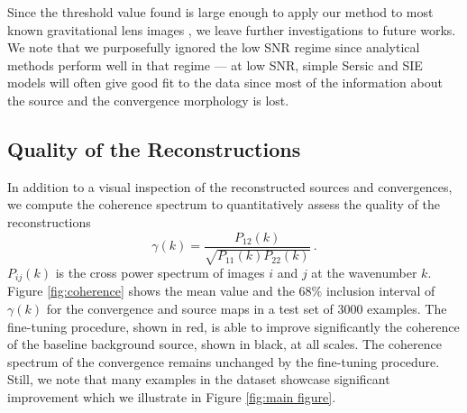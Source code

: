 Since the threshold value found is large enough to apply our method to most known 
gravitational lens images \citep{Bolton2008,Shu2017},
we leave further investigations to future works.
We note that we purposefully ignored the 
low SNR regime since analytical methods perform well in that regime --- at low SNR, simple 
Sersic \citep{Sersic1963} and SIE \citep[]{keeton2001} models will often give good fit to the data 
since most of the information about the source and the convergence morphology is lost.





\subsection{Quality of the Reconstructions}\label{sec:quality of reconstructions}


In addition to a visual inspection of the reconstructed sources 
and convergences, we compute 
the coherence spectrum to quantitatively assess the quality of the reconstructions
\begin{equation}\label{eq:coherence} 
        \gamma(k) = \frac{P_{12}(k)}{\sqrt{P_{11}(k) P_{22}(k)}} \, .
\end{equation}
$P_{ij}(k)$ is the cross power spectrum of images $i$ and $j$ at 
the wavenumber $k$. Figure \ref{fig:coherence} shows the mean value and the $68\%$ inclusion interval of $\gamma(k)$ 
for the convergence and source maps in a test set of 3000 examples. 
The fine-tuning 
procedure, shown in red, is able to improve significantly the coherence of the baseline background 
source, shown in black, at all scales. 
The coherence spectrum of the convergence remains unchanged by the fine-tuning procedure.
Still, we note that many examples in the dataset showcase significant 
improvement which we illustrate in Figure \ref{fig:main figure}.



